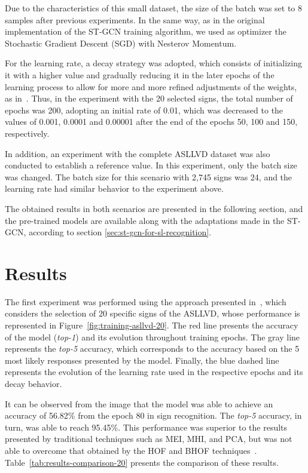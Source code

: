 Due to the characteristics of this small dataset, the size of the batch was set to 8 samples after previous experiments. 
In the same way, as in the original implementation of the ST-GCN training algorithm, we used as optimizer the Stochastic Gradient Descent (SGD) with Nesterov Momentum. 

For the learning rate, a decay strategy was adopted, which consists of initializing it with a higher value and gradually reducing it in the later epochs of the learning process to allow for more and more refined adjustments of the weights, as in~\cite{st-gcn-2018}. Thus, in the experiment with the 20 selected signs, the total number of epochs was 200, adopting an initial rate of 0.01, which was decreased to the values of 0.001, 0.0001 and 0.00001 after the end of the epochs 50, 100 and 150, respectively.

In addition, an experiment with the complete ASLLVD dataset was also conducted to establish a reference value. In this experiment, only the batch size was changed. The batch size for this scenario with 2,745 signs was 24, and the learning rate had similar behavior to the experiment above.

The obtained results in both scenarios are presented in the following section, and the pre-trained models are available along with the adaptations made in the ST-GCN, according to section \ref{sec:st-gcn-for-sl-recognition}.


\section{Results} 
\label{sec:results}

The first experiment was performed using the approach presented in~\cite{lim-2016}, which considers the selection of 20 specific signs of the ASLLVD, whose performance is represented in Figure~\ref{fig:training-asllvd-20}. The red line presents the accuracy of the model (\textit{top-1}) and its evolution throughout training epochs. The gray line represents the \textit{top-5} accuracy, which corresponds to the accuracy based on the 5 most likely responses presented by the model. Finally, the blue dashed line represents the evolution of the learning rate used in the respective epochs and its decay behavior.

It can be observed from the image that the model was able to achieve an accuracy of 56.82\% from the epoch 80 in sign recognition. The \textit{top-5} accuracy, in turn, was able to reach 95.45\%. This performance was superior to the results presented by traditional techniques such as MEI, MHI, and PCA, but was not able to overcome that obtained by the HOF and BHOF techniques~\cite{lim-2016}. Table~\ref{tab:results-comparison-20} presents the comparison of these results.

